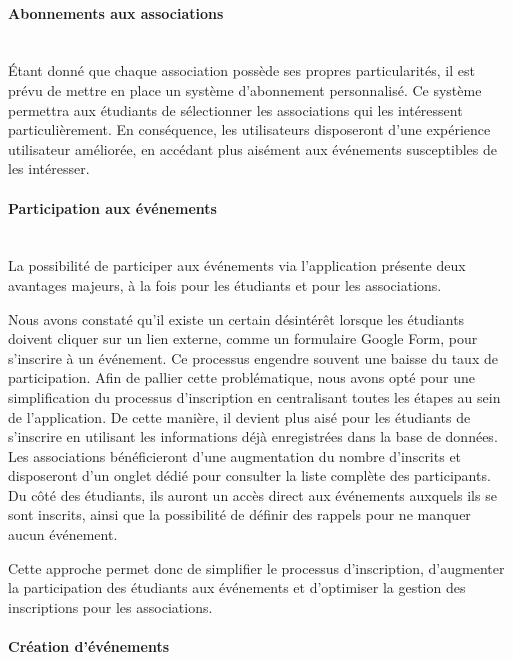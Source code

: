 \paragraph{Abonnements aux associations}
~~\\

Étant donné que chaque association possède ses propres particularités, il est prévu de mettre en place un système d'abonnement personnalisé. Ce système permettra aux étudiants de sélectionner les associations qui les intéressent particulièrement. En conséquence, les utilisateurs disposeront d'une expérience utilisateur améliorée, en accédant plus aisément aux événements susceptibles de les intéresser.

\paragraph{Participation aux événements}
~~\\

La possibilité de participer aux événements via l'application présente deux avantages majeurs, à la fois pour les étudiants et pour les associations.

Nous avons constaté qu'il existe un certain désintérêt lorsque les étudiants doivent cliquer sur un lien externe, comme un formulaire Google Form, pour s'inscrire à un événement. Ce processus engendre souvent une baisse du taux de participation. Afin de pallier cette problématique, nous avons opté pour une simplification du processus d'inscription en centralisant toutes les étapes au sein de l'application. De cette manière, il devient plus aisé pour les étudiants de s'inscrire en utilisant les informations déjà enregistrées dans la base de données. Les associations bénéficieront d'une augmentation du nombre d'inscrits et disposeront d'un onglet dédié pour consulter la liste complète des participants. Du côté des étudiants, ils auront un accès direct aux événements auxquels ils se sont inscrits, ainsi que la possibilité de définir des rappels pour ne manquer aucun événement.

Cette approche permet donc de simplifier le processus d'inscription, d'augmenter la participation des étudiants aux événements et d'optimiser la gestion des inscriptions pour les associations.


\paragraph{Création d'événements}
~~\\

